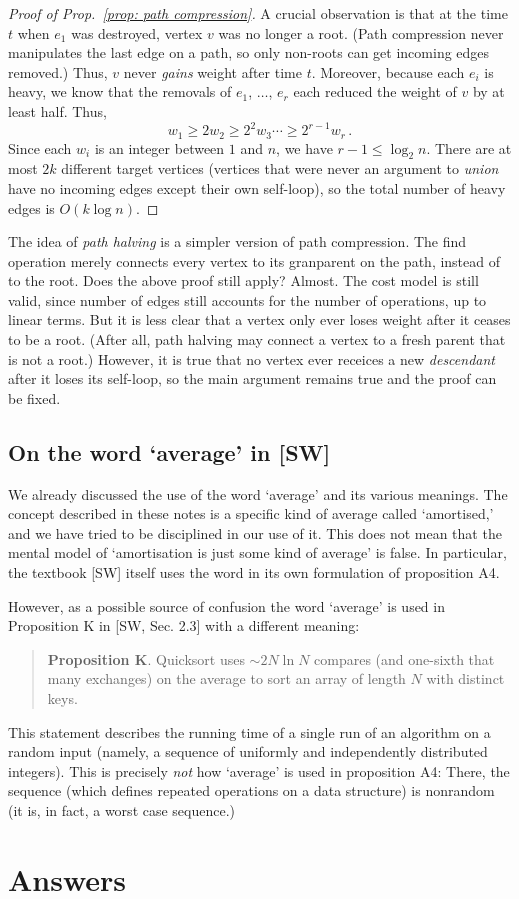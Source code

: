 \documentclass{tstextbook}
\begin{document}
\begin{proof}[Proof of Prop.~\ref{prop: path compression}]
  A crucial observation is that at the time $t$ when $e_1$ was destroyed, vertex $v$ was no longer a root.
  (Path compression never manipulates the last edge on a path, so only non-roots can get  incoming edges removed.)
  Thus, $v$ never \emph{gains} weight after time $t$.
  Moreover, because each $e_i$ is heavy, we know that the removals of $e_1$, $\ldots$, $e_r$ each reduced the weight of $v$ by at least half.
  Thus, 
  \[ w_1\geq 2 w_2 \geq 2^2w_3\cdots\geq 2^{r-1} w_r\,.\]
  Since each $w_i$ is an integer between $1$ and $n$, we have $r - 1\leq \log_2 n$.
  There are at most $2k$ different target vertices (vertices that were never an argument to \emph{union} have no incoming edges except their own self-loop), so the total number of heavy edges is $O(k\log n)$.
\end{proof}

\begin{ExerciseList}
  \Exercise{}
  The idea of \emph{path halving} is a simpler version of path compression. 
  The find operation merely connects every vertex to its granparent on the path, instead of to the root.
  Does the above proof still apply?
  \Answer{}
  Almost.
  The cost model is still valid, since number of edges still accounts for the number of operations, up to linear terms.
  But it is less clear that a vertex only ever loses weight after it ceases to be a root.
  (After all, path halving may connect a vertex to a fresh parent that is not a root.)
  However, it is true that no vertex ever receices a new \emph{descendant} after it loses its self-loop, so the main argument remains true and the proof can be fixed.
\end{ExerciseList}

\section{On the word `average' in [SW]}

We already discussed the use of the word `average' and its various meanings.
The concept described in these notes is a specific kind of average called `amortised,' and we have tried to be disciplined in our use of it.
This does not mean that the mental model of `amortisation is just some kind of average' is false.
In particular, the textbook [SW] itself uses the word in its own formulation of proposition A4.

However, as a possible source of confusion the word `average' is used in Proposition K in [SW, Sec. 2.3] with a different meaning:
\begin{quote}
  {\bf Proposition K}. Quicksort uses $\sim 2N\ln N$ compares (and one-sixth that many exchanges) on the average to sort an array of length $N$ with distinct keys.
\end{quote}
This statement describes the running time of a single run of an algorithm on a random input (namely, a sequence of uniformly and independently distributed integers).
This is precisely \emph{not} how `average' is used in proposition A4:
There, the sequence (which defines repeated operations on a data structure) is nonrandom (it is, in fact, a worst case sequence.)

\chapter{Answers}

\shipoutAnswer
\end{document}
